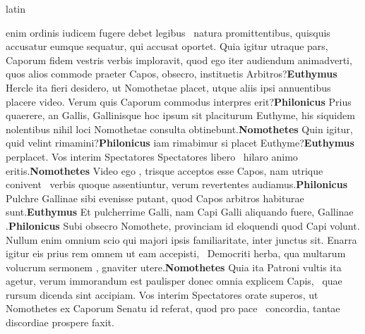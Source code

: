 \documentclass[12pt]{book}
\renewenvironment{latin}
    	{\begin{hyphenrules}{latin}}
    	{\end{hyphenrules}}
\begin{document}
\begin{pages}
\begin{latin}
\begin{Leftside}
                    enim ordinis iudicem fugere debet legibus ﻿\ampersand\ natura promittentibus, 
                    quisquis accusatur eumque sequatur, qui accusat oportet. 
                    Quia igitur utraque pars, Caporum fidem vestris verbis imploravit, 
                    quod ego  iter audiendum animadverti, 
                    quos alios commode praeter Capos, obsecro, instituetis Arbitros?\pend\pstart\textbf{Euthymus }\hspace{1cm} Hercle ita fieri desidero, ut Nomothetae placet, utque aliis ipsi annuentibus placere video. 
                    Verum quis Caporum commodus interpres erit?\pend\pstart\textbf{Philonicus }\hspace{1cm} Prius quaerere, an Gallis, Gallinisque hoc ipsum sit placiturum Euthyme, his siquidem nolentibus nihil loci Nomothetae consulta obtinebunt.\pend\pstart\textbf{Nomothetes }\hspace{1cm} Quin igitur, quid velint rimamini?\pend\pstart\textbf{Philonicus }\hspace{1cm} iam rimabimur si placet Euthyme?\pend\pstart\textbf{Euthymus }\hspace{1cm} perplacet. Vos interim Spectatores Spectatores libero ﻿\ampersand\ hilaro animo eritis.\pend\pstart\textbf{Nomothetes }\hspace{1cm} Video ego , trisque acceptos esse Capos, nam utrique conivent ﻿\ampersand\ verbis quoque assentiuntur, verum revertentes audiamus.\pend\pstart\textbf{Philonicus }\hspace{1cm} Pulchre Gallinae sibi evenisse putant, quod Capos arbitros habiturae sunt.\pend\pstart\textbf{Euthymus }\hspace{1cm} Et pulcherrime Galli, nam Capi Galli aliquando fuere, Gallinae .\pend\pstart\textbf{Philonicus }\hspace{1cm} Subi obsecro Nomothete, provinciam id eloquendi quod Capi volunt. 
                    Nullum enim omnium scio qui majori ipsis familiaritate, inter  junctus sit. 
                    Enarra igitur eis prius rem omnem ut eam accepisti, ﻿\ampersand\ Democriti herba, qua multarum volucrum sermonem , gnaviter utere.\pend\pstart\textbf{Nomothetes }\hspace{1cm} Quia ita Patroni vultis ita agetur, verum immorandum est paulisper donec omnia explicem Capis, ﻿\ampersand\ quae rursum dicenda sint accipiam. 
                    Vos interim Spectatores orate superos, ut Nomothetes  ex Caporum Senatu id referat, 
                    quod pro pace ﻿\ampersand\ concordia, tantae discordiae prospere faxit.\pend 
        \endnumbering
        \end{Leftside}
        \end{latin}


\end{pages}
\end{document}
